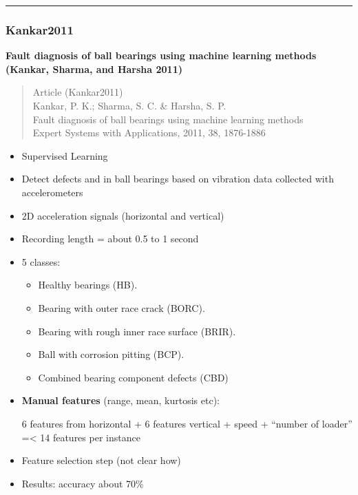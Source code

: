 \documentclass[
  letterpaper,
  DIV=11,
  numbers=noendperiod]{scrartcl}
\providecommand{\tightlist}{%
  \setlength{\itemsep}{0pt}\setlength{\parskip}{0pt}}
\begin{document}
\begin{center}\rule{0.5\linewidth}{0.5pt}\end{center}

\subsubsection{Kankar2011}\label{kankar2011}

\textbf{Fault diagnosis of ball bearings using machine learning methods
(Kankar, Sharma, and Harsha 2011)}

\begin{quote}
Article (Kankar2011)\\
Kankar, P. K.; Sharma, S. C. \& Harsha, S. P.\\
Fault diagnosis of ball bearings using machine learning methods\\
Expert Systems with Applications, 2011, 38, 1876-1886
\end{quote}

\begin{itemize}
\item
  Supervised Learning
\item
  Detect defects and in ball bearings based on vibration data collected
  with accelerometers
\item
  2D acceleration signals (horizontal and vertical)
\item
  Recording length = about 0.5 to 1 second
\item
  5 classes:

  \begin{itemize}
  \tightlist
  \item
    Healthy bearings (HB).
  \item
    Bearing with outer race crack (BORC).
  \item
    Bearing with rough inner race surface (BRIR).
  \item
    Ball with corrosion pitting (BCP).
  \item
    Combined bearing component defects (CBD)
  \end{itemize}
\item
  \textbf{Manual features} (range, mean, kurtosis etc):

  6 features from horizontal + 6 features vertical + speed + ``number of
  loader'' =\textless{} 14 features per instance
\item
  Feature selection step (not clear how)
\item
  Results: accuracy about 70\%
\end{itemize}
\end{document}
